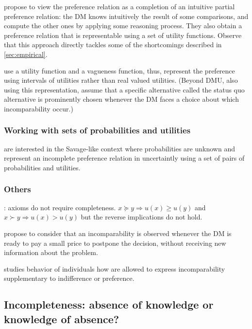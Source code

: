 \documentclass[french, english]{llncs}
\begin{document}
	\citet{dubra_model_2002} propose to view the preference relation as a completion of an intuitive partial preference relation: the \ac{DM} knows intuitively the result of some comparisons, and compute the other ones by applying some reasoning process. They also obtain a preference relation that is representable using a set of utility functions. Observe that this approach directly tackles some of the shortcomings described in \cref{sec:empirical}.
	
	\citet{manzini_representation_2008} use a utility function and a vagueness function, thus, represent the preference using intervals of utilities rather than real valued utilities. (Beyond DMU, also using this representation, \citet{masatlioglu_rational_2005} assume that a specific alternative called the status quo alternative is prominently chosen whenever the \ac{DM} faces a choice about which incomparability occur.)
	
	\subsubsection{Working with sets of probabilities and utilities}
	
	\citet{galaabaatar_subjective_2013} are interested in the Savage-like context where probabilities are unknown and represent an incomplete preference relation in uncertaintly using a set of pairs of probabilities and utilities.
	
	\subsubsection{Others}
	\citet{aumann_utility_1962}: axioms do not require completeness. $x \succeq y ⇒ u(x) ≥ u(y)$ and $x \succ y ⇒ u(x) > u(y)$ but the reverse implications do not hold.

	\citet{danan_are_2006} propose to consider that an incomparability is observed whenever the \ac{DM} is ready to pay a small price to postpone the decision, without receiving new information about the problem.
	
\citet{deparis_when_2012} studies behavior of individuals how are allowed to express incomparability supplementary to indifference or preference.

	\subsection{Incompleteness: absence of knowledge or knowledge of absence?}
	
\end{document}
